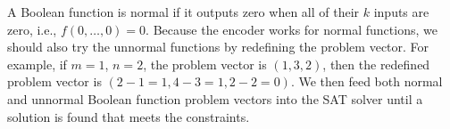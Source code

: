 \documentclass[conference,letterpaper]{IEEEtran}
\begin{document}
A Boolean function is normal if it outputs zero when all of their $k$ inputs are zero, i.e., $f(0,\ldots,0)=0$.
Because the encoder works for normal functions, we should also try the unnormal functions by redefining the problem vector. 
For example, if $m = 1$, $n = 2$, the problem vector is $(1,3,2)$, then the redefined problem vector is $(2-1=1, 4-3=1, 2-2=0)$. 
We then feed both normal and unnormal Boolean function problem vectors into the SAT solver until a solution is found that meets the constraints.



%
\end{document}
